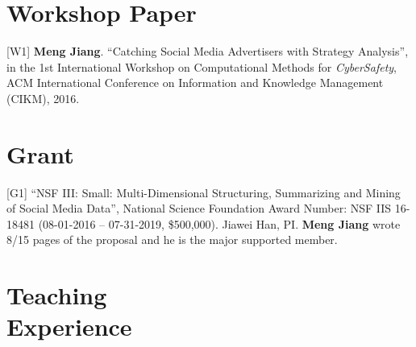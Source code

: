 \documentclass[margin, 10pt]{res}
\begin{document}
\begin{resume}

\section{Workshop Paper}

[W1] {\bf Meng Jiang}. ``Catching Social Media Advertisers with Strategy Analysis'', in the 1st International Workshop on Computational Methods for \textit{CyberSafety}, ACM International Conference on Information and Knowledge Management (CIKM), 2016.


\section{Grant}

[G1] ``NSF III: Small: Multi-Dimensional Structuring, Summarizing and Mining of Social Media Data'', National Science Foundation Award Number: NSF IIS 16-18481 (08-01-2016 -- 07-31-2019, \$500,000). Jiawei Han, PI. {\bf Meng Jiang} wrote 8/15 pages of the proposal and he is the major supported member.


\section{Teaching \\ Experience}


\end{resume}
\end{document}
